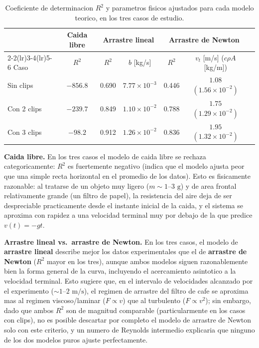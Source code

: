 \begin{table}[htbp]
  \centering
  \caption{Coeficiente de determinacion $R^2$ y parametros fisicos ajustados para cada modelo teorico, en los tres casos de estudio.}
  \label{tab:resumen_modelos}
  \begin{tabular}{@{}lcccccc@{}}
    \toprule
     & \multicolumn{1}{c}{Caida libre} & \multicolumn{2}{c}{Arrastre lineal} & \multicolumn{2}{c}{Arrastre de Newton} \\
    \cmidrule(lr){2-2}\cmidrule(lr){3-4}\cmidrule(lr){5-6}
    Caso & $R^2$ & $R^2$ & $b$ [kg/s] & $R^2$ & $v_t$ [m/s] ($c\rho A$ [kg/m]) \\
    \midrule
    Sin clips   & $-856.8$ & 0.690 & $7.77\times10^{-3}$ & 0.446 & $1.08$ $(1.56\times10^{-2})$ \\
    Con 2 clips & $-239.7$ & 0.849 & $1.10\times10^{-2}$ & 0.788 & $1.75$ $(1.29\times10^{-2})$ \\
    Con 3 clips & $-98.2$  & 0.912 & $1.26\times10^{-2}$ & 0.836 & $1.95$ $(1.32\times10^{-2})$ \\
    \bottomrule
  \end{tabular}
\end{table}

\textbf{Caida libre.} En los tres casos el modelo de caida libre se rechaza
categoricamente: $R^2$ es fuertemente negativo (indica que el modelo ajusta
peor que una simple recta horizontal en el promedio de los datos). Esto es
fisicamente razonable: al tratarse de un objeto muy ligero
($m\sim1\text{--}3\text{ g}$) y de area frontal relativamente grande (un
filtro de papel), la resistencia del aire deja de ser despreciable practicamente
desde el instante inicial de la caida, y el sistema se aproxima con rapidez
a una velocidad terminal muy por debajo de la que predice $v(t)=-gt$.

\textbf{Arrastre lineal vs.\ arrastre de Newton.} En los tres casos, el
modelo de \textbf{arrastre lineal} describe mejor los datos experimentales
que el de \textbf{arrastre de Newton} ($R^2$ mayor en los tres), aunque
ambos modelos siguen razonablemente bien la forma general de la curva,
incluyendo el acercamiento asintotico a la velocidad terminal. Esto sugiere
que, en el intervalo de velocidades alcanzado por el experimento
($\sim 1$--$2\text{ m/s}$), el regimen de arrastre del filtro de cafe se
aproxima mas al regimen viscoso/laminar ($F\propto v$) que al turbulento
($F\propto v^2$); sin embargo, dado que ambos $R^2$ son de magnitud
comparable (particularmente en los casos con clips), no es posible
descartar por completo el modelo de arrastre de Newton solo con este
criterio, y un numero de Reynolds intermedio explicaria que ninguno de los
dos modelos puros ajuste perfectamente.

